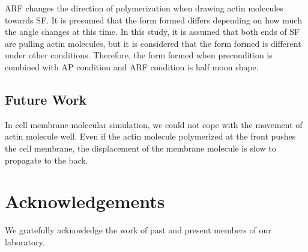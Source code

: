 \documentclass[a4paper,12pt]{book}
\begin{document}
ARF changes the direction of polymerization when drawing actin molecules towards SF.
It is presumed that the form formed differs depending on how much the angle changes at this time.
In this study, it is assumed that both ends of SF are pulling actin molecules, but it is considered that the form formed is different under other conditions.
Therefore, the form formed when precondition is combined with AP condition and ARF condition is half moon shape.


\section{Future Work}
In cell membrane molecular simulation, we could not cope with the movement of actin molecule well. Even if the actin molecule polymerized at the front pushes the cell membrane, the displacement of the membrane molecule is slow to propagate to the back.
\chapter*{Acknowledgements}
We gratefully acknowledge the work of past and present members of our laboratory.




\end{document}
